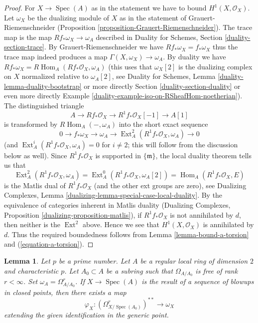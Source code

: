 \documentclass{stacks-project}
\theoremstyle{plain}
\newtheorem{lemma}[subsection]{Lemma}
\theoremstyle{definition}
\theoremstyle{remark}
\numberwithin{equation}{subsection}
\def\Spec{\mathop{\mathrm{Spec}}}
\def\Hom{\mathop{\mathrm{Hom}}\nolimits}
\def\Ext{\mathop{\mathrm{Ext}}\nolimits}
\begin{document}
\begin{proof}
For $X \to \Spec(A)$ as in the statement we have to bound
$H^1(X, \mathcal{O}_X)$. Let $\omega_X$ be the dualizing module
of $X$ as in the statement of Grauert-Riemenschneider
(Proposition \ref{proposition-Grauert-Riemenschneider}).
The trace map is the map $Rf_*\omega_X \to \omega_A$ described
in Duality for Schemes, Section \ref{duality-section-trace}.
By Grauert-Riemenschneider we have $Rf_*\omega_X = f_*\omega_X$
thus the trace map indeed produces a map $\Gamma(X, \omega_X) \to \omega_A$.
By duality we have $Rf_*\omega_X = R\Hom_A(Rf_*\mathcal{O}_X, \omega_A)$
(this uses that $\omega_X[2]$ is the dualizing complex on $X$
normalized relative to $\omega_A[2]$,
see Duality for Schemes, Lemma \ref{duality-lemma-duality-bootstrap}
or more directly Section \ref{duality-section-duality} or even more directly
Example \ref{duality-example-iso-on-RSheafHom-noetherian}).
The distinguished triangle
$$
A \to Rf_*\mathcal{O}_X \to R^1f_*\mathcal{O}_X[-1] \to A[1]
$$
is transformed by $R\Hom_A(-, \omega_A)$ into the short exact sequence
$$
0 \to f_*\omega_X \to \omega_A \to
\Ext_A^2(R^1f_*\mathcal{O}_X, \omega_A) \to 0
$$
(and $\Ext_A^i(R^1f_*\mathcal{O}_X, \omega_A) = 0$ for $i \not = 2$;
this will follow from the discussion below as well).
Since $R^1f_*\mathcal{O}_X$ is supported in $\{\mathfrak m\}$, the
local duality theorem tells us that
$$
\Ext_A^2(R^1f_*\mathcal{O}_X, \omega_A) =
\Ext_A^0(R^1f_*\mathcal{O}_X, \omega_A[2]) =
\Hom_A(R^1f_*\mathcal{O}_X, E)
$$
is the Matlis dual of $R^1f_*\mathcal{O}_X$ (and the other
ext groups are zero), see
Dualizing Complexes, Lemma \ref{dualizing-lemma-special-case-local-duality}.
By the equivalence of categories inherent in Matlis duality
(Dualizing Complexes, Proposition \ref{dualizing-proposition-matlis}),
if $R^1f_*\mathcal{O}_X$ is not annihilated by $d$,
then neither is the $\Ext^2$ above. Hence we see that
$H^1(X, \mathcal{O}_X)$ is annihilated by $d$. Thus the required
boundedness follows from Lemma \ref{lemma-bound-a-torsion} and
(\ref{equation-a-torsion}).
\end{proof}

\begin{lemma}
\label{lemma-compare-differentials-dualizing}
Let $p$ be a prime number.
Let $A$ be a regular local ring of dimension $2$ and characteristic $p$.
Let $A_0 \subset A$ be a subring such that $\Omega_{A/A_0}$ is free
of rank $r < \infty$. Set $\omega_A = \Omega^r_{A/A_0}$. If $X \to \Spec(A)$
is the result of a sequence of blowups in closed points, then
there exists a map
$$
\varphi_X : (\Omega^r_{X/\Spec(A_0)})^{**} \longrightarrow \omega_X
$$
extending the given identification in the generic point.
\end{lemma}
\end{document}
